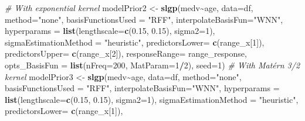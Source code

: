 \documentclass[
]{article}
\newenvironment{Shaded}{\begin{snugshade}}{\end{snugshade}}
\newcommand{\AttributeTok}[1]{\textcolor[rgb]{0.13,0.29,0.53}{#1}}
\newcommand{\CommentTok}[1]{\textcolor[rgb]{0.56,0.35,0.01}{\textit{#1}}}
\newcommand{\DecValTok}[1]{\textcolor[rgb]{0.00,0.00,0.81}{#1}}
\newcommand{\FloatTok}[1]{\textcolor[rgb]{0.00,0.00,0.81}{#1}}
\newcommand{\FunctionTok}[1]{\textcolor[rgb]{0.13,0.29,0.53}{\textbf{#1}}}
\newcommand{\NormalTok}[1]{#1}
\newcommand{\OtherTok}[1]{\textcolor[rgb]{0.56,0.35,0.01}{#1}}
\newcommand{\SpecialCharTok}[1]{\textcolor[rgb]{0.81,0.36,0.00}{\textbf{#1}}}
\newcommand{\StringTok}[1]{\textcolor[rgb]{0.31,0.60,0.02}{#1}}
\begin{document}
\begin{Shaded}
\begin{Highlighting}[]
\CommentTok{\# With exponential kernel}
\NormalTok{modelPrior2 }\OtherTok{\textless{}{-}} \FunctionTok{slgp}\NormalTok{(medv}\SpecialCharTok{\textasciitilde{}}\NormalTok{age, }
                    \AttributeTok{data=}\NormalTok{df,}
                    \AttributeTok{method=}\StringTok{"none"}\NormalTok{, }
                    \AttributeTok{basisFunctionsUsed =} \StringTok{"RFF"}\NormalTok{,}
                    \AttributeTok{interpolateBasisFun=}\StringTok{"WNN"}\NormalTok{, }
                    \AttributeTok{hyperparams =} \FunctionTok{list}\NormalTok{(}\AttributeTok{lengthscale=}\FunctionTok{c}\NormalTok{(}\FloatTok{0.15}\NormalTok{, }\FloatTok{0.15}\NormalTok{), }
                                       \AttributeTok{sigma2=}\DecValTok{1}\NormalTok{), }
                    \AttributeTok{sigmaEstimationMethod =} \StringTok{"heuristic"}\NormalTok{, }
                    \AttributeTok{predictorsLower=} \FunctionTok{c}\NormalTok{(range\_x[}\DecValTok{1}\NormalTok{]),}
                    \AttributeTok{predictorsUpper=} \FunctionTok{c}\NormalTok{(range\_x[}\DecValTok{2}\NormalTok{]),}
                    \AttributeTok{responseRange=}\NormalTok{ range\_response,}
                    \AttributeTok{opts\_BasisFun =} \FunctionTok{list}\NormalTok{(}\AttributeTok{nFreq=}\DecValTok{200}\NormalTok{,}
                                         \AttributeTok{MatParam=}\DecValTok{1}\SpecialCharTok{/}\DecValTok{2}\NormalTok{),}
                    \AttributeTok{seed=}\DecValTok{1}\NormalTok{)}
\CommentTok{\# With Matérn 3/2 kernel}
\NormalTok{modelPrior3 }\OtherTok{\textless{}{-}} \FunctionTok{slgp}\NormalTok{(medv}\SpecialCharTok{\textasciitilde{}}\NormalTok{age, }
                    \AttributeTok{data=}\NormalTok{df,}
                    \AttributeTok{method=}\StringTok{"none"}\NormalTok{, }
                    \AttributeTok{basisFunctionsUsed =} \StringTok{"RFF"}\NormalTok{,}
                    \AttributeTok{interpolateBasisFun=}\StringTok{"WNN"}\NormalTok{, }
                    \AttributeTok{hyperparams =} \FunctionTok{list}\NormalTok{(}\AttributeTok{lengthscale=}\FunctionTok{c}\NormalTok{(}\FloatTok{0.15}\NormalTok{, }\FloatTok{0.15}\NormalTok{), }
                                       \AttributeTok{sigma2=}\DecValTok{1}\NormalTok{), }
                    \AttributeTok{sigmaEstimationMethod =} \StringTok{"heuristic"}\NormalTok{, }
                    \AttributeTok{predictorsLower=} \FunctionTok{c}\NormalTok{(range\_x[}\DecValTok{1}\NormalTok{]),}

\end{Highlighting}
\end{Shaded}
\end{document}
